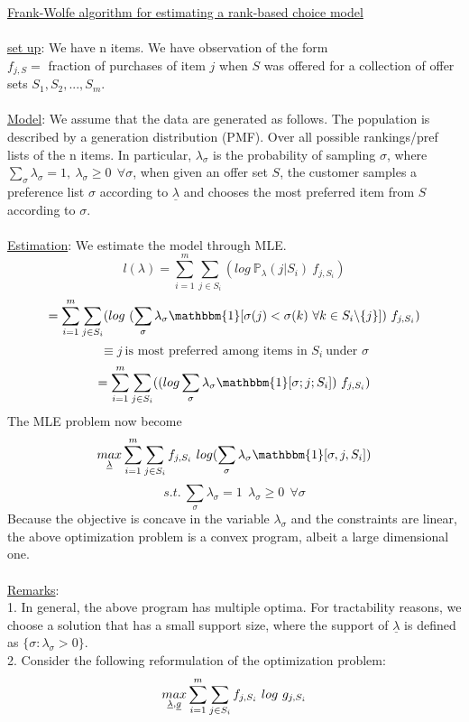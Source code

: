 \documentclass[11pt]{article}
\begin{document}
{\LARGE \underline{Frank-Wolfe algorithm for estimating a rank-based choice model}}\\~\\
\underline{set up}: We have n items. We have observation of the form\\
\indent \qquad $f_{j, S} = $ fraction of purchases of item $j$ when $S$ was offered for a collection of offer sets $S_1, S_2, ... , S_m$.\\~\\
\underline{Model}: We assume that the data are generated as follows. The population is described by a generation distribution (PMF). Over all possible rankings/pref lists of the n items. In particular, $\lambda_{\sigma}$ is the probability of sampling $\sigma$, where $\sum_{\sigma}\lambda_{\sigma}=1,\ \lambda_{\sigma}\geq0\ \ \forall \sigma$, when given an offer set $S$, the customer samples a preference list $\sigma$ according to $\underline{\lambda}$ and chooses the most preferred item from $S$ according to $\sigma$.\\~\\
\underline{Estimation}: We estimate the model through MLE.
$$l(\lambda) = \sum_{i=1}^m \sum_{j\in S_i}(log\ \mathbb{P}_{\lambda}(j|S_i)\ f_{j,S_i})$$
$$=\sum_{i=1}^m\sum_{j\in S_i}(log\ (\sum_{\sigma}\lambda_{\sigma}\mathbbm{1}[\sigma(j)<\sigma(k)\ \forall k\in S_i\backslash \{j\}])\ f_{j,S_i})$$
$$\equiv j\  \textrm{is most preferred among items in } S_i\  \textrm{under }\sigma$$
$$=\sum_{i=1}^m\sum_{j\in S_i}((log\sum_{\sigma}\lambda_{\sigma}\mathbbm{1}[\sigma;j;S_i])\ f_{j,S_i})$$
The MLE problem now become
$$\underset{\underline{\lambda}}{max}\sum_{i=1}^m\sum_{j\in S_i} f_{j,S_i}\ log(\sum_{\sigma}\lambda_{\sigma}\mathbbm{1}[\sigma,j,S_i])$$
$$s.t.\ \sum_{\sigma}\lambda_{\sigma}=1\ \ \lambda_{\sigma}\geq 0 \ \ \forall \sigma$$
Because the objective is concave in the variable $\lambda_{\sigma}$ and the constraints are linear, the above optimization problem is a convex program, albeit a large dimensional one.\\~\\
\underline{Remarks}:\\
1. In general, the above program has multiple optima. For tractability reasons, we choose a solution that has a small support size, where the support of $\underline{\lambda}$ is defined as $\{\sigma : \lambda_{\sigma}>0\}$.\\
2. Consider the following reformulation of the optimization problem:
\[
\underset{\underline{\lambda},\underline{g}}{max}\sum_{i=1}^m\sum_{j\in S_i} f_{j,S_i}\ log\ g_{j,S_i}\\
\]
\end{document}
